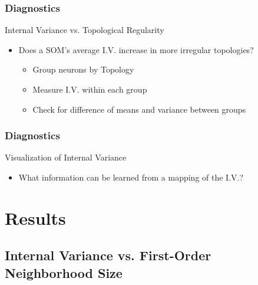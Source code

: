 \documentclass[nototal,handout]{beamer}
\begin{document}
\begin{frame}
	\frametitle{Diagnostics}
 
\begin{block}{Internal Variance vs. Topological Regularity}
 \begin{itemize}
 \item  Does a SOM's average I.V. increase in more irregular topologies?
 \begin{itemize}
 \item  Group neurons by Topology
 \item  Measure I.V. within each group
 \item  Check for difference of means and variance between groups
 \end{itemize}
 \end{itemize}
 \end{block} \end{frame} 

\begin{frame}
	\frametitle{Diagnostics}
 
\begin{block}{Visualization of Internal Variance}
 \begin{itemize}
 \item  What information can be learned from a mapping of the I.V.?
 \end{itemize}
 \end{block} \end{frame} 


\section{Results} 

\subsection{Internal Variance vs. First-Order Neighborhood Size} 
\end{document}
